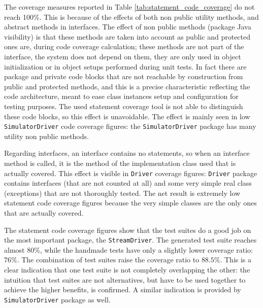 \documentclass[english]{lni}
\newcommand{\lil}[1]{\texttt{\lstinline|#1|}}
\begin{document}
The coverage measures reported in Table \ref{tab:statement_code_coverage} do not reach 100\%. 
This is because of the effects of both non public utility methods, and abstract methods in interfaces.
The effect of non public methods (package Java visibility) is that these methods are taken into account as public and protected ones are, during code coverage calculation; these methods are not part of the interface, the system does not depend on them, they are only used in object initialization or in object setups performed during unit tests. 
In fact there are package and private code blocks that are not reachable by construction from public and protected methods, and this is a precise characteristic reflecting the code architecture, meant to ease class instances setup and configuration for testing purposes. 
The used statement coverage tool is not able to distinguish these code blocks, so this effect is unavoidable. 
The effect is mainly seen in low \lil{SimulatorDriver} code coverage figures: the \lil{SimulatorDriver} package has many utility non public methods.

Regarding interfaces, an interface contains no statements, so when an interface method is called, it is the method of the implementation class used that is actually covered.
This effect is visible in \lil{Driver} coverage figures: \lil{Driver} package contains interfaces (that are not counted at all) and some very simple real class (exceptions) that are not thoroughly tested. 
The net result is extremely low statement code coverage figures because the very simple classes are the only ones that are actually covered. 

The statement code coverage figures show that the test suites do a good job on the most important package, the \lil{StreamDriver}. 
The generated test suite reaches almost $ 80 \% $, while the handmade tests have only a slightly lower coverage ratio: $ 76 \% $. 
The combination of test suites raise the coverage ratio to $ 88.5 \% $. 
This is a clear indication that one test suite is not completely overlapping the other: the intuition that test suites are not alternatives, but have to be used together to achieve the higher benefits, is confirmed.
A similar indication is provided by \lil{SimulatorDriver} package as well.
\end{document}
